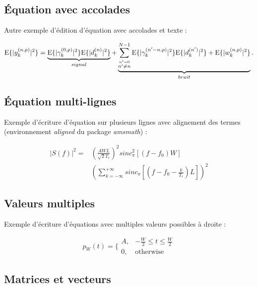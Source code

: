 \documentclass[11pt,a4paper,french]{article}
\begin{document}
\subsection{Équation avec accolades}\label{sec:SS_EQ2}

Autre exemple d'édition d'équation avec accolades et texte :

\begin{equation}
\label{E_RX_DETECT_DP4}
\textup{E}\{|y_k^{(n,p)}|^2\} = \underbrace{\textup{E}\{|\gamma_{k}^{(0, p)}|^2\} \textup{E}\{|d_k^{(n)}|^2\}}_{signal}
+\underbrace{\sum_{\stackrel{n'=0}{n'\neq n}}^{N-1}\textup{E}\{|\gamma_{k}^{(n'-n, p)}|^2\} \textup{E}\{|d_{k}^{(n')}|^2\}
+\textup{E}\{|w_k^{(n,p)}|^2\}}_{bruit}.
\end{equation}

\subsection{Équation multi-lignes}\label{sec:SS_EQ3}

Exemple d'écriture d'équation sur plusieurs lignes avec alignement des termes (environnement \emph{aligned} du package \emph{amsmath}) :

\begin{equation}
	\label{E_MOD_PULSE_FIN_TRAIN_SED}
	\begin{aligned}
		|S(f)|^2 = &(\frac{AWL}{\sqrt{2}T_r})^2sinc_{\pi}^2[(f-f_0)W]\\
		&(\sum_{k=-\infty}^{+\infty}sinc_{\pi}[(f-f_0-\frac{k}{T_r})L])^2
	\end{aligned}
\end{equation}

\subsection{Valeurs multiples}\label{sec:SS_EQ4}

Exemple d'écriture d'équations avec multiples valeurs possibles à droite :

\begin{equation}
	\label{E_PULSE}
	p_W(t)= 
	\{
	\begin{array}{cc}
		A,  &-\frac{W}{2} \leq t \leq \frac{W}{2}\\
		0,  &\text{otherwise}
	\end{array}
\end{equation}


\subsection{Matrices et vecteurs}\label{sec:SS_EQ6}
\end{document}
